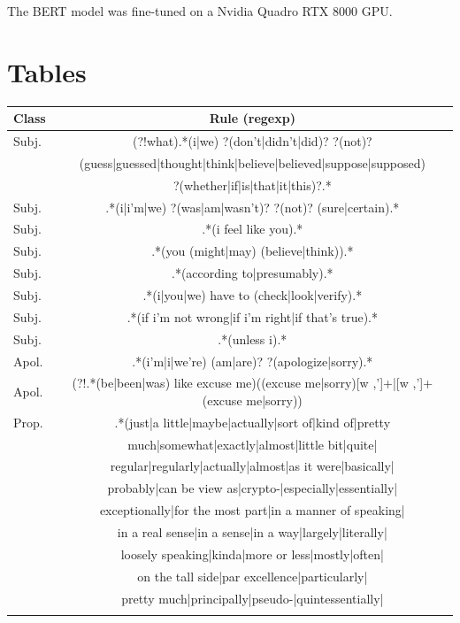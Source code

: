 \documentclass[11pt]{article}
\begin{document}
\noindent The BERT model was fine-tuned on a Nvidia Quadro RTX 8000 GPU.

\section{Tables}

\begin{table}[t]
  \tabcolsep=0.11cm
  \small
  \centering
  \begin{tabular}{l|c} \toprule
    Class & Rule (regexp) \\ \midrule
    Subj. & (?!what).*(i|we) ?(don't|didn't|did)? ?(not)? \\    & (guess|guessed|thought|think|believe|believed|suppose|supposed) \\ & ?(whether|if|is|that|it|this)?.* \\
    Subj. & .*(i|i'm|we) ?(was|am|wasn't)? ?(not)? (sure|certain).* \\
    Subj. & .*(i feel like you).* \\
    Subj. & .*(you (might|may) (believe|think)).* \\
    Subj. & .*(according to|presumably).* \\
    Subj. & .*(i|you|we) have to (check|look|verify).* \\
    Subj. & .*(if i'm not wrong|if i'm right|if that's true).* \\
    Subj. & .*(unless i).* \\
    Apol. & .*(i'm|i|we're) (am|are)? ?(apologize|sorry).* \\
    Apol. & (?!.*(be|been|was) like excuse me)((excuse me|sorry)[w ,']+|[w ,']+(excuse me|sorry)) \\
    Prop. & .*(just|a little|maybe|actually|sort of|kind of|pretty \\ & much|somewhat|exactly|almost|little bit|quite| \\ &
    regular|regularly|actually|almost|as it were|basically| \\ &
    probably|can be view as|crypto-|especially|essentially| \\ &
    exceptionally|for the most part|in a manner of speaking| \\ &
    in a real sense|in a sense|in a way|largely|literally| \\ &
    loosely speaking|kinda|more or less|mostly|often| \\ &
    on the tall side|par excellence|particularly| \\ &
    pretty much|principally|pseudo-|quintessentially| \\ &

\end{tabular}
\end{table}
\end{document}
